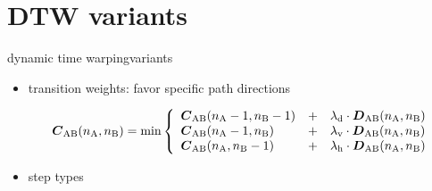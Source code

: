     \section[variants]{DTW variants}
        \begin{frame}{dynamic time warping}{variants}
            \begin{itemize}
                \item	transition weights: favor specific path directions
                    \begin{footnotesize}
                        \begin{equation*}
                            \mat{C}_{\mathrm{AB}}(n_\mathrm{A},n_\mathrm{B}) = \min\left\{
                                                    \begin{array}{lll} 
                                                    \mat{C}_{\mathrm{AB}}(n_\mathrm{A}-1,n_\mathrm{B}-1)	&+& \lambda_\mathrm{d}\cdot\mat{D}_{\mathrm{AB}}(n_\mathrm{A},n_\mathrm{B})\\
                                                    \mat{C}_{\mathrm{AB}}(n_\mathrm{A}-1,n_\mathrm{B}) 	&+& \lambda_\mathrm{v}\cdot\mat{D}_{\mathrm{AB}}(n_\mathrm{A},n_\mathrm{B})\\
                                                    \mat{C}_{\mathrm{AB}}(n_\mathrm{A},n_\mathrm{B}-1) 	&+& \lambda_\mathrm{h}\cdot\mat{D}_{\mathrm{AB}}(n_\mathrm{A},n_\mathrm{B})
                                                    \end{array} 
                                                    \right.\nonumber
                        \end{equation*}
                    \end{footnotesize}
                \item<2->	step types
                \begin{figure}
                    
                \end{figure}
                
            \end{itemize}
        \end{frame}
